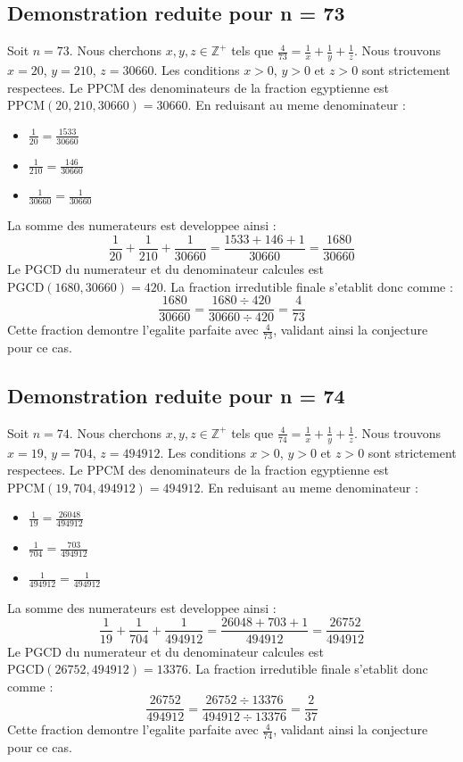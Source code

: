 \documentclass[11pt,a4paper]{article}
\begin{document}
\subsection{Demonstration reduite pour n = 73}
Soit $n = 73$. Nous cherchons $x, y, z \in \mathbb{Z}^{+}$ tels que $\frac{4}{73} = \frac{1}{x} + \frac{1}{y} + \frac{1}{z}$.
Nous trouvons $x = 20$, $y = 210$, $z = 30660$.
Les conditions $x > 0$, $y > 0$ et $z > 0$ sont strictement respectees.
Le PPCM des denominateurs de la fraction egyptienne est $\text{PPCM}(20, 210, 30660) = 30660$.
En reduisant au meme denominateur :
\begin{itemize}
    \item $\frac{1}{20} = \frac{1533}{30660}$
    \item $\frac{1}{210} = \frac{146}{30660}$
    \item $\frac{1}{30660} = \frac{1}{30660}$
\end{itemize}
La somme des numerateurs est developpee ainsi :
$$ \frac{1}{20} + \frac{1}{210} + \frac{1}{30660} = \frac{1533 + 146 + 1}{30660} = \frac{1680}{30660} $$
Le PGCD du numerateur et du denominateur calcules est $\text{PGCD}(1680, 30660) = 420$.
La fraction irredutible finale s'etablit donc comme :
$$ \frac{1680}{30660} = \frac{1680 \div 420}{30660 \div 420} = \frac{4}{73} $$
Cette fraction demontre l'egalite parfaite avec $\frac{4}{73}$, validant ainsi la conjecture pour ce cas.

\subsection{Demonstration reduite pour n = 74}
Soit $n = 74$. Nous cherchons $x, y, z \in \mathbb{Z}^{+}$ tels que $\frac{4}{74} = \frac{1}{x} + \frac{1}{y} + \frac{1}{z}$.
Nous trouvons $x = 19$, $y = 704$, $z = 494912$.
Les conditions $x > 0$, $y > 0$ et $z > 0$ sont strictement respectees.
Le PPCM des denominateurs de la fraction egyptienne est $\text{PPCM}(19, 704, 494912) = 494912$.
En reduisant au meme denominateur :
\begin{itemize}
    \item $\frac{1}{19} = \frac{26048}{494912}$
    \item $\frac{1}{704} = \frac{703}{494912}$
    \item $\frac{1}{494912} = \frac{1}{494912}$
\end{itemize}
La somme des numerateurs est developpee ainsi :
$$ \frac{1}{19} + \frac{1}{704} + \frac{1}{494912} = \frac{26048 + 703 + 1}{494912} = \frac{26752}{494912} $$
Le PGCD du numerateur et du denominateur calcules est $\text{PGCD}(26752, 494912) = 13376$.
La fraction irredutible finale s'etablit donc comme :
$$ \frac{26752}{494912} = \frac{26752 \div 13376}{494912 \div 13376} = \frac{2}{37} $$
Cette fraction demontre l'egalite parfaite avec $\frac{4}{74}$, validant ainsi la conjecture pour ce cas.
\end{document}
